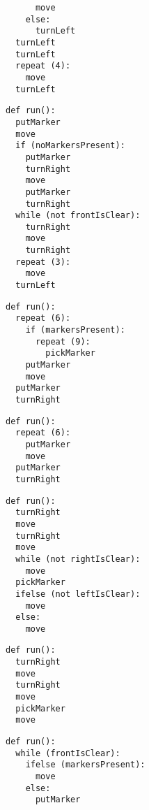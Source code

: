 \begin{figure}
\begin{minipage}{0.3\textwidth}
\begin{verbatim}
      move
    else:
      turnLeft
  turnLeft
  turnLeft
  repeat (4):
    move
  turnLeft
\end{verbatim}
\end{minipage}
\begin{minipage}{0.25\textwidth}
\begin{verbatim}
def run():
  putMarker
  move
  if (noMarkersPresent):
    putMarker
    turnRight
    move
    putMarker
    turnRight
  while (not frontIsClear):
    turnRight
    move
    turnRight
  repeat (3):
    move
  turnLeft
\end{verbatim}
\end{minipage}
\begin{minipage}{0.25\textwidth}
\begin{verbatim}
def run():
  repeat (6):
    if (markersPresent):
      repeat (9):
        pickMarker
    putMarker
    move
  putMarker
  turnRight
\end{verbatim}
\end{minipage}
\begin{minipage}{0.15\textwidth}
\begin{verbatim}
def run():
  repeat (6):
    putMarker
    move
  putMarker
  turnRight
\end{verbatim}
\end{minipage}
\par\vspace{3mm}
\begin{minipage}{0.3\textwidth}
\begin{verbatim}
def run():
  turnRight
  move
  turnRight
  move
  while (not rightIsClear):
    move
  pickMarker
  ifelse (not leftIsClear):
    move
  else:
    move
\end{verbatim}
\end{minipage}
\begin{minipage}{0.15\textwidth}
\begin{verbatim}
def run():
  turnRight
  move
  turnRight
  move
  pickMarker
  move
\end{verbatim}
\end{minipage}
\begin{minipage}{0.30\textwidth}
\begin{verbatim}
def run():
  while (frontIsClear):
    ifelse (markersPresent):
      move
    else:
      putMarker
\end{verbatim}
\end{minipage}

\end{figure}

